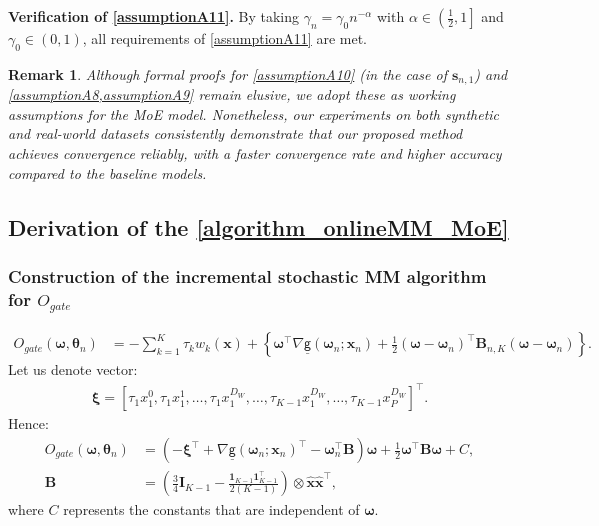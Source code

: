 \documentclass{article}
\newtheorem{remark}{Remark}
\def\sfg{\mathsf{g}}
\def\vxi{{\bm{\xi}}}
\def\vomega{{\bm{\omega}}}
\def\vtheta{{\bm{\theta}}}
\def\vs{{\bm{s}}}
\def\vx{{\bm{x}}}
\def\mB{{\bm{B}}}
\def\mI{{\bm{I}}}
\begin{document}
\textbf{Verification of \cref{assumptionA11}.} By taking $\gamma_n=\gamma_0 n^{-\alpha}$ with $\alpha\in\left(\tfrac12,1\right]$ and $\gamma_0\in(0,1)$, all requirements of \cref{assumptionA11} are met.

\begin{remark}
    Although formal proofs for \cref{assumptionA10} (in the case of $\vs_{n,1}$) and \cref{assumptionA8,assumptionA9} remain elusive, we adopt these as working assumptions for the MoE model. Nonetheless, our experiments on both synthetic and real-world datasets consistently demonstrate that our proposed method achieves convergence reliably, with a faster convergence rate and higher accuracy compared to the baseline models.
\end{remark}

\subsection{Derivation of the \texorpdfstring{\cref{algorithm_onlineMM_MoE}}{Algorithm \ref*{algorithm_onlineMM_MoE}}}\label{proof_algorithm_onlineMM_MoE}

\subsubsection{Construction of the incremental stochastic MM algorithm for \texorpdfstring{$O_{gate}$}{}}\label{section_construction_MM_Ogate}


\begin{align*}
O_{gate}(\vomega,\vtheta_n) &= -\sum_{k=1}^{K}\tau_{k}w_k(\vx)+\displaystyle\left\{\vomega^{\top}\nabla \underline{\sfg}(\vomega_n;\vx_n)+\frac{1}{2}\left(\vomega-\vomega_n\right)^{\top}\mB_{n,K}\left(\vomega-\vomega_n\right)\right\}.
\end{align*}
Let us denote vector:
\begin{align*}
    \vxi=[\tau_{1}x_1^{0}, \tau_{1}x_1^{1},\dots, \tau_{1}x_1^{D_W},\dots,\tau_{K-1}x_1^{D_W},\dots,\tau_{K-1}x_P^{D_W}]^{\top}.
\end{align*}
Hence:
\begin{align*}
    O_{gate}(\vomega,\vtheta_n)&=\left(-\vxi^{\top}+\nabla \underline{\sfg}(\vomega_n;\vx_n)^{\top}-\vomega_n^{\top}\mB\right)\vomega+\frac{1}{2}\vomega^{\top}\mB\vomega+ C,\\
    \mB&=\left(\frac{3}{4}\mI_{K-1}-\frac{\bm{1}_{K-1}\bm{1}_{K-1}^{\top}}{2(K-1)}\right)\otimes\hat{\vx}\hat{\vx}^{\top},
\end{align*}
 where $C$ represents the constants that are independent of $\vomega$.
 
\end{document}
